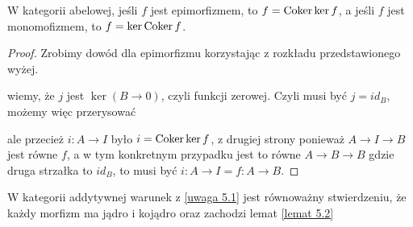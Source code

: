 \begin{lemma}\label{lemat 5.2}
  W kategorii abelowej, jeśli $f$ jest epimorfizmem, to $f=\operatorname{Coker}\ker f$, a jeśli $f$ jest monomofizmem, to $f=\ker\operatorname{Coker} f$.
\end{lemma}

\begin{proof}
  Zrobimy dowód dla epimorfizmu korzystając z rozkładu przedstawionego wyżej.

  \begin{center}\end{center}
  
  wiemy, że $j$ jest $\ker(B\to 0)$, czyli funkcji zerowej. Czyli musi być $j=id_B$, możemy więc przerysować

  \begin{center}\end{center}
  ale przecież $i:A\to I$ było $i=\operatorname{Coker}\ker f$, z drugiej strony ponieważ $A\to I\to B$ jest równe $f$, a w tym konkretnym przypadku jest to równe $A\to B\to B$ gdzie druga strzałka to $id_B$, to musi być $i:A\to I=f:A\to B$.
\end{proof}

\begin{uwaga}
  W kategorii addytywnej warunek z \ref{uwaga 5.1} jest równoważny stwierdzeniu, że każdy morfizm ma jądro i kojądro oraz zachodzi lemat \ref{lemat 5.2}
\end{uwaga}

